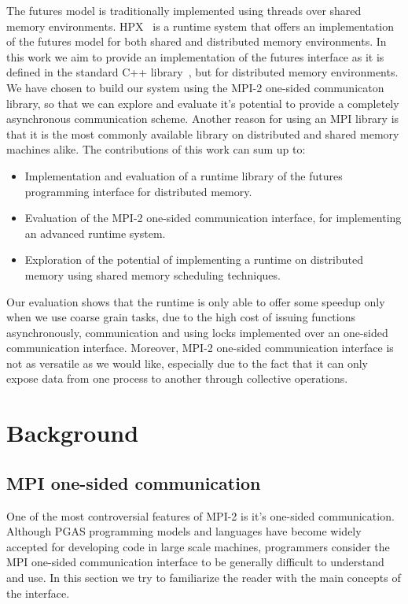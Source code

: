The futures model is traditionally implemented using threads over shared memory environments.  
HPX~\cite{HPX:TOBE} is a runtime system that offers an implementation of the futures model 
for both shared and distributed memory environments.  In this work we aim to provide an 
implementation of the futures interface as it is defined in the standard C++ library~\cite{CPP:Threads}, 
but for distributed memory environments.  We have chosen to build our system using the MPI-2 one-sided
communicaton library, so that we can explore and evaluate it's potential to provide a completely asynchronous
communication scheme.  Another reason for using an MPI library is that it is the most commonly available 
library on distributed and shared memory machines alike.  
The contributions of this work can sum up to:
\\
\begin{itemize}
	\item Implementation and evaluation of a runtime library of the futures programming interface 
	for distributed memory. 
	\item Evaluation of the MPI-2 one-sided communication interface, for implementing an advanced runtime system.
	\item Exploration of the potential of implementing a runtime on distributed memory using shared memory scheduling techniques.
\\
\end{itemize}
Our evaluation shows that the runtime is only able to offer some speedup only when we use coarse grain 
tasks, due to the high cost of issuing functions asynchronously, communication and using locks implemented over
an one-sided communication interface.  Moreover, MPI-2 one-sided communication interface is not as versatile as we 
would like, especially due to the fact that it can only expose data from one process to another through collective 
operations.  

\section{Background}

\label{sect:mpi-one-sided}
\subsection{MPI one-sided communication}

One of the most controversial features of MPI-2 is it's one-sided communication.  Although PGAS programming
models and languages have become widely accepted for developing code in large scale machines, programmers
consider the MPI one-sided communication interface to be generally difficult to understand and use.  In this
section we try to familiarize the reader with the main concepts of the interface.  


